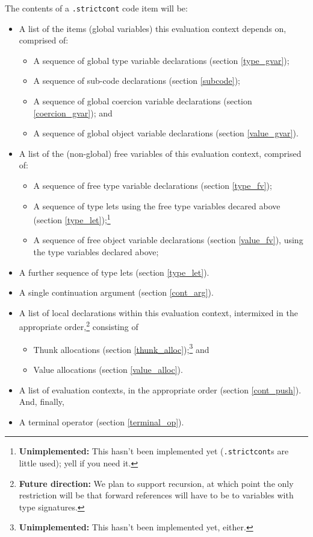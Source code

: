 \documentclass{report}
\newcommand\stringcode[1]{\texttt{#1}}
\newcommand\unimpl[1]{\footnote{\textbf{Unimplemented: }#1}}
\newcommand\future[1]{\footnote{\textbf{Future direction:} #1}}
\begin{document}
The contents of a \stringcode{.strictcont} code item will be:
\begin{itemize}
    \item A list of the items (global variables) this evaluation context depends on, comprised of:
        \begin{itemize}
            \item A sequence of global type variable declarations (section \ref{type_gvar});
            \item A sequence of sub-code declarations (section \ref{subcode});
            \item A sequence of global coercion variable declarations (section \ref{coercion_gvar}); and
            \item A sequence of global object variable declarations (section \ref{value_gvar}).
        \end{itemize}
    \item A list of the (non-global) free variables of this evaluation context, comprised of:
        \begin{itemize}
            \item A sequence of free type variable declarations (section \ref{type_fv});
            \item A sequence of type lets using the free type variables decared above (section \ref{type_let});\unimpl{This hasn't been implemented yet (\stringcode{.strictcont}s are little used); yell if you need it.}
            \item A sequence of free object variable declarations (section \ref{value_fv}), using the type variables declared above;
        \end{itemize}
    \item A further sequence of type lets (section \ref{type_let}).
    \item A single continuation argument (section \ref{cont_arg}).
    \item A list of local declarations within this evaluation context,
        intermixed in the appropriate order,\future{We plan to support recursion, at which point the only restriction will be that forward references will have to be to variables with type signatures.}
        consisting of
        \begin{itemize}
            \item Thunk allocations (section \ref{thunk_alloc});\unimpl{This hasn't been implemented yet, either.} and
            \item Value allocations (section \ref{value_alloc}).
        \end{itemize}
    \item A list of evaluation contexts, in the appropriate order (section \ref{cont_push}).
        And, finally,
    \item A terminal operator (section \ref{terminal_op}).
\end{itemize}
\end{document}
